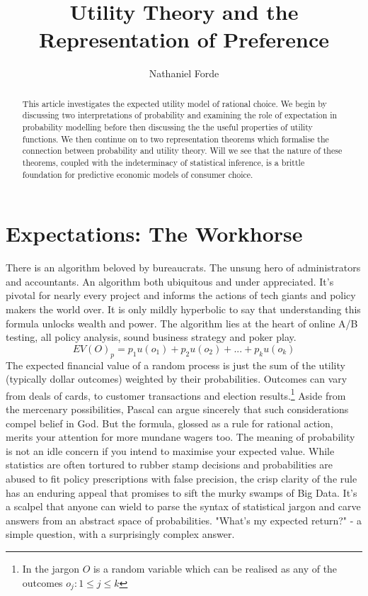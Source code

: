 \documentclass{tufte-handout}
\title{Utility Theory and the Representation of Preference}
\author[Nathaniel Forde]{Nathaniel Forde}
\begin{document}
\maketitle%

\begin{abstract}
\noindent
This article investigates the expected utility model of rational choice. We begin by discussing two interpretations of probability and examining the role of expectation in probability modelling before then discussing the the useful properties of utility functions. We then continue on to two representation theorems which formalise the connection between probability and utility theory. Will we see that the nature of these theorems, coupled with the indeterminacy of statistical inference, is a brittle foundation for predictive economic models of consumer choice.
\end{abstract}

\section{\textbf{Expectations: The Workhorse}}
\label{sec:Expectations}
There is an algorithm beloved by bureaucrats. The unsung hero of administrators and accountants. An algorithm both ubiquitous and under appreciated. It's pivotal for nearly every project and informs the actions of tech giants and policy makers the world over. It is only mildly hyperbolic to say that understanding this formula unlocks wealth and power. The algorithm lies at the heart of online A/B testing, all policy analysis, sound business strategy and poker play. 
$$ EV(O)_{p} = p_{1}u(o_{1}) + p_{2}u(o_{2}) + ... + p_{k}u(o_{k}) $$
The expected financial value of a random process is just the sum of the utility (typically dollar outcomes) weighted by their probabilities. 
Outcomes can vary from deals of cards, to customer transactions and election results.\footnote{In the jargon $O$ is a random variable which can be realised as any of the outcomes  $ o_{j} :  1 \leq j \leq k$} Aside from the mercenary possibilities, Pascal can argue sincerely that such considerations compel belief in God. But the formula, glossed as a rule for rational action, merits your attention for more mundane wagers too. The meaning of probability is not an idle concern if you intend to maximise your expected value. While statistics are often tortured to rubber stamp decisions and probabilities are abused to fit policy prescriptions with false precision, the crisp clarity of the rule has an enduring appeal that promises to sift the murky swamps of Big Data. It's a scalpel that anyone can wield to parse the syntax of statistical jargon and carve answers from an abstract space of probabilities. "What's my expected return?" - a simple question, with a surprisingly complex answer. 
\linebreak
\end{document}
